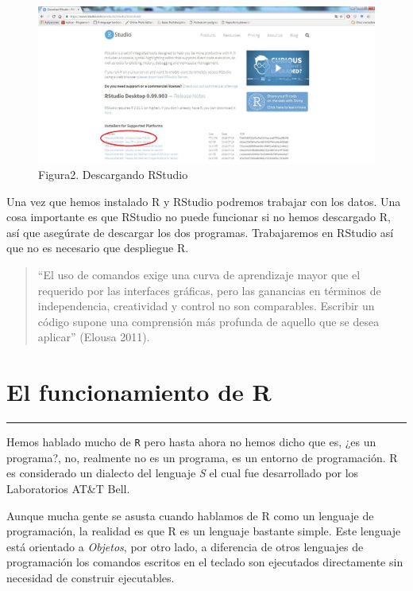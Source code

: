 \documentclass[]{article}
\begin{document}
\begin{figure}[htbp]
\centering
\includegraphics{imagen/descargarRStudio.jpg}
\caption{Figura2. Descargando RStudio}
\end{figure}

Una vez que hemos instalado R y RStudio podremos trabajar con los datos.
Una cosa importante es que RStudio no puede funcionar si no hemos
descargado R, así que asegúrate de descargar los dos programas.
Trabajaremos en RStudio así que no es necesario que despliegue R.

\begin{quote}
``El uso de comandos exige una curva de aprendizaje mayor que el
requerido por las interfaces gráficas, pero las ganancias en términos de
independencia, creatividad y control no son comparables. Escribir un
código supone una comprensión más profunda de aquello que se desea
aplicar'' (Elousa 2011).
\end{quote}

\section{El funcionamiento de R}\label{el-funcionamiento-de-r}

\begin{center}\rule{0.5\linewidth}{\linethickness}\end{center}

Hemos hablado mucho de \texttt{R} pero hasta ahora no hemos dicho que
es, ¿es un programa?, no, realmente no es un programa, es un entorno de
programación. R es considerado un dialecto del lenguaje \emph{S} el cual
fue desarrollado por los Laboratorios AT\&T Bell.

Aunque mucha gente se asusta cuando hablamos de R como un lenguaje de
programación, la realidad es que R es un lenguaje bastante simple. Este
lenguaje está orientado a \emph{Objetos}, por otro lado, a diferencia de
otros lenguajes de programación los comandos escritos en el teclado son
ejecutados directamente sin necesidad de construir ejecutables.
\end{document}

